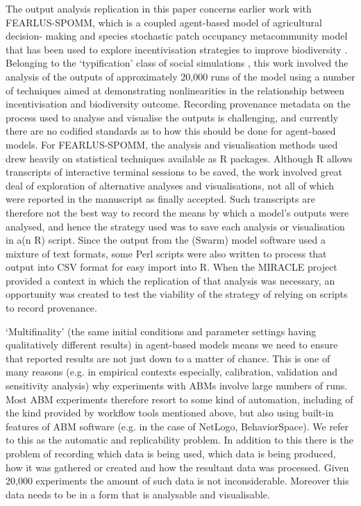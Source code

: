 \documentclass[runningheads]{llncs}
\begin{document}
The output analysis replication in this paper concerns earlier work with
FEARLUS-SPOMM, which is a coupled agent-based model of agricultural decision-
making and species stochastic patch occupancy metacommunity model that has been
used to explore incentivisation strategies to improve biodiversity
\cite{polhill_nonlinearities_2013,gimona2011exploring}. Belonging to the
‘typification’ class of social simulations  \cite{boero2005does}, this work
involved the analysis of the outputs of approximately 20,000 runs of the model
using a number of techniques aimed at demonstrating nonlinearities in the
relationship between incentivisation and biodiversity outcome.  Recording
provenance metadata on the process used to analyse and visualise the outputs is challenging, and
currently there are no codified standards as to how this should be done for
agent-based models. For FEARLUS-SPOMM, the analysis and visualisation methods used drew heavily on statistical
techniques available as R packages.
Although R allows transcripts of interactive terminal sessions to be saved, the
work involved great deal of exploration of alternative analyses and visualisations, not all of
which were reported in the manuscript as finally accepted. Such transcripts are therefore not the
best way to record the means by which a model's outputs were analysed, and hence the
strategy used was to save each analysis or visualisation in a(n R) script.
Since the output from the (Swarm) model software used a mixture of text formats, some Perl scripts were also written to
process that output into CSV format for easy import into R. When the MIRACLE
project \cite{parker2019final} provided a context in which the replication of
that analysis was necessary, an opportunity was created to test the viability
of the strategy of relying on scripts to record provenance.

`Multifinality' (the same initial conditions and parameter settings having qualitatively different results) in agent-based models means we need to ensure that
reported results are not just down to a matter of chance. This is one of many reasons (e.g. in empirical contexts especially, calibration, validation and sensitivity analysis) why experiments with ABMs involve large numbers of runs. Most ABM experiments therefore resort to some kind of automation, including of the kind provided by workflow tools mentioned above, but also using built-in features of ABM software (e.g. in the case of NetLogo, BehaviorSpace). We refer to this
as the automatic and replicability problem. In addition to this there is the
problem of recording which data is being used, which data is being produced,
how it was gathered or created and how the resultant data was processed. Given
20,000 experiments the amount of such data is not inconsiderable. Moreover this
data needs to be in a form that is analysable and visualisable. 
\end{document}
